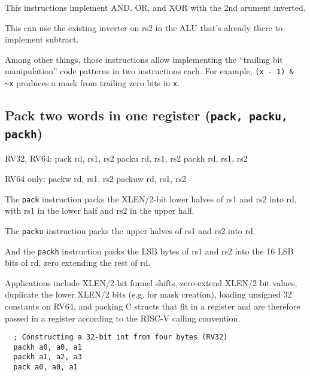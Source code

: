 This instructions implement AND, OR, and XOR with the 2nd arument inverted.



This can use the existing inverter on rs2 in the ALU that's already there to
implement subtract.

Among other things, those instructions allow implementing the ``trailing bit
manipulation'' code patterns in two instructions each. For example, {\tt (x -
1) \& \textasciitilde{}x} produces a mask from trailing zero bits in {\tt x}.


\subsection{Pack two words in one register (\texttt{pack, packu, packh})}

\begin{rvb}
  RV32, RV64:
    pack  rd, rs1, rs2
    packu rd, rs1, rs2
    packh rd, rs1, rs2

  RV64 only:
    packw  rd, rs1, rs2
    packuw rd, rs1, rs2
\end{rvb}

The {\tt pack} instruction packs the XLEN/2-bit lower halves of rs1 and rs2 into
rd, with rs1 in the lower half and rs2 in the upper half.



The {\tt packu} instruction packs the upper halves of rs1 and rs2 into rd.



And the {\tt packh} instruction packs the LSB bytes of rs1 and rs2 into the 16 LSB bits
of rd, zero extending the rest of rd.



Applications include XLEN/2-bit funnel shifts, zero-extend XLEN/2 bit values, duplicate the lower
XLEN/2 bits (e.g. for mask creation), loading unsigned 32 constants on RV64, and packing
C structs that fit in a register and are therefore passed in a register according to the RISC-V
calling convention.

\begin{minipage}{\linewidth}
\begin{verbatim}
  ; Constructing a 32-bit int from four bytes (RV32)
  packh a0, a0, a1
  packh a1, a2, a3
  pack a0, a0, a1
\end{verbatim}
\end{minipage}

